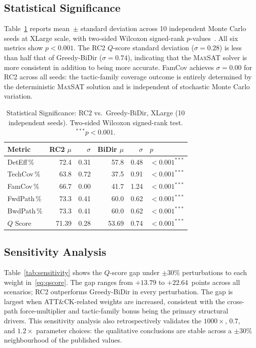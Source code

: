 \documentclass[journal]{IEEEtran}
\newcommand{\MAXSAT}{\textsc{MaxSAT}}
\newcommand{\qscore}{$Q$-score}
\begin{document}
\subsection{Statistical Significance}
\label{sec:results:stats}

Table~\ref{tab:stats} reports mean~$\pm$ standard deviation across
10 independent Monte Carlo seeds at XLarge scale, with two-sided
Wilcoxon signed-rank $p$-values~\cite{wilcoxon1945}. All six metrics
show $p<0.001$. The RC2 \qscore{} standard deviation ($\sigma=0.28$)
is less than half that of Greedy-BiDir ($\sigma=0.74$), indicating
that the \MAXSAT{} solver is more consistent in addition to being
more accurate. FamCov achieves $\sigma=0.00$ for RC2 across all
seeds: the tactic-family coverage outcome is entirely determined by
the deterministic \MAXSAT{} solution and is independent of
stochastic Monte Carlo variation.

\begin{table}[!htb]
\caption{Statistical Significance: RC2 vs.\ Greedy-BiDir, XLarge
  (10 independent seeds). Two-sided Wilcoxon signed-rank test.
  $^{***}p<0.001$.}
\label{tab:stats}
\centering
\renewcommand{\arraystretch}{1.2}
\begin{tabular}{lrrrrl}
\toprule
Metric & RC2 $\mu$ & $\sigma$ & BiDir $\mu$ & $\sigma$ & $p$ \\
\midrule
DetEff\,\%  & 72.4 & 0.31 & 57.8 & 0.48 & $<0.001^{***}$ \\
TechCov\,\% & 63.8 & 0.72 & 37.5 & 0.91 & $<0.001^{***}$ \\
FamCov\,\%  & 66.7 & 0.00 & 41.7 & 1.24 & $<0.001^{***}$ \\
FwdPath\,\% & 73.3 & 0.41 & 60.0 & 0.62 & $<0.001^{***}$ \\
BwdPath\,\% & 73.3 & 0.41 & 60.0 & 0.62 & $<0.001^{***}$ \\
$Q$ Score   & 71.39 & 0.28 & 53.69 & 0.74 & $<0.001^{***}$ \\
\bottomrule
\end{tabular}
\end{table}

\subsection{Sensitivity Analysis}
\label{sec:results:sensitivity}

Table~\ref{tab:sensitivity} shows the \qscore{} gap under $\pm30\%$
perturbations to each weight in~\eqref{eq:qscore}. The gap ranges
from $+13.79$ to $+22.64$~points across all scenarios; RC2
outperforms Greedy-BiDir in every perturbation. The gap is largest
when ATT\&CK-related weights are increased, consistent with the
cross-path force-multiplier and tactic-family bonus being the
primary structural drivers. This sensitivity analysis also
retrospectively validates the $1000\times$, $0.7$, and $1.2\times$
parameter choices: the qualitative conclusions are stable across a
$\pm30\%$ neighbourhood of the published values.
\end{document}
